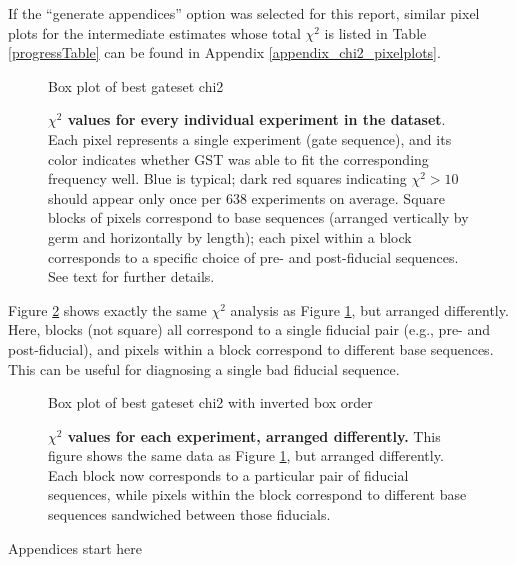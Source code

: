 \documentclass{article}[11pt]
\newcommand{\putfield}[2]{#2}
\begin{document}
{If the ``generate appendices'' option was selected for this report, similar pixel plots for the intermediate estimates whose total $\chi^2$ is listed in Table \ref{progressTable} can be found in Appendix \ref{appendix_chi2_pixelplots}.

\begin{figure}
\begin{center}
\putfield{bestEstimateColorBoxPlot}{Box plot of best gateset chi2}
\caption{\putfield{tt_bestEstimateColorBoxPlot}{}\textbf{$\chi^2$ values for every individual experiment in the dataset}.  Each pixel represents a single experiment (gate sequence), and its color indicates whether GST was able to fit the corresponding frequency well.  Blue is typical; dark red squares indicating $\chi^2>10$ should appear only once per 638 experiments on average.  Square blocks of pixels correspond to base sequences (arranged vertically by germ and horizontally by length); each pixel within a block corresponds to a specific choice of pre- and post-fiducial sequences.  See text for further details.\label{bestEstimateColorBoxPlot}}
\end{center}
\end{figure}

Figure \ref{invertedBestEstimateColorBoxPlot} shows exactly the same $\chi^2$ analysis as Figure \ref{bestEstimateColorBoxPlot}, but arranged differently.  Here, blocks (not square) all correspond to a single fiducial pair (e.g., pre- and post-fiducial), and pixels within a block correspond to different base sequences.  This can be useful for diagnosing a single bad fiducial sequence.

\begin{figure}
\begin{center}
\putfield{invertedBestEstimateColorBoxPlot}{Box plot of best gateset chi2 with inverted box order}
\caption{\putfield{tt_invertedBestEstimateColorBoxPlot}{}\textbf{$\chi^2$ values for each experiment, arranged differently.}  This figure shows the same data as Figure \ref{bestEstimateColorBoxPlot}, but arranged differently.  Each block now corresponds to a particular pair of fiducial sequences, while pixels within the block correspond to different base sequences sandwiched between those fiducials.\label{invertedBestEstimateColorBoxPlot}}
\end{center}
\end{figure}

}{}

\putfield{appendices}{Appendices start here}
\end{document}
